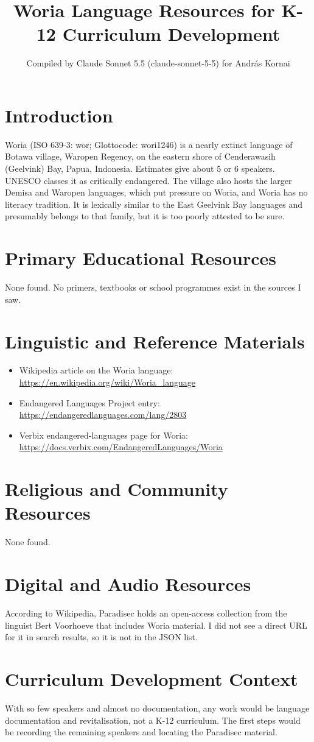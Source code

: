 \documentclass[12pt]{article}
\title{Woria Language Resources for K-12 Curriculum Development}
\author{Compiled by Claude Sonnet 5.5 (claude-sonnet-5-5) for Andr\'as Kornai}
\date{}
\begin{document}
\maketitle

\section{Introduction}
Woria (ISO 639-3: wor; Glottocode: wori1246) is a nearly extinct language of Botawa village, Waropen Regency, on the eastern shore of Cenderawasih (Geelvink) Bay, Papua, Indonesia. Estimates give about 5 or 6 speakers. UNESCO classes it as critically endangered. The village also hosts the larger Demisa and Waropen languages, which put pressure on Woria, and Woria has no literacy tradition. It is lexically similar to the East Geelvink Bay languages and presumably belongs to that family, but it is too poorly attested to be sure.

\section{Primary Educational Resources}
None found. No primers, textbooks or school programmes exist in the sources I saw.

\section{Linguistic and Reference Materials}
\begin{itemize}
\item Wikipedia article on the Woria language: \url{https://en.wikipedia.org/wiki/Woria_language}
\item Endangered Languages Project entry: \url{https://endangeredlanguages.com/lang/2803}
\item Verbix endangered-languages page for Woria: \url{https://docs.verbix.com/EndangeredLanguages/Woria}
\end{itemize}

\section{Religious and Community Resources}
None found.

\section{Digital and Audio Resources}
According to Wikipedia, Paradisec holds an open-access collection from the linguist Bert Voorhoeve that includes Woria material. I did not see a direct URL for it in search results, so it is not in the JSON list.

\section{Curriculum Development Context}
With so few speakers and almost no documentation, any work would be language documentation and revitalisation, not a K-12 curriculum. The first steps would be recording the remaining speakers and locating the Paradisec material.
\end{document}
